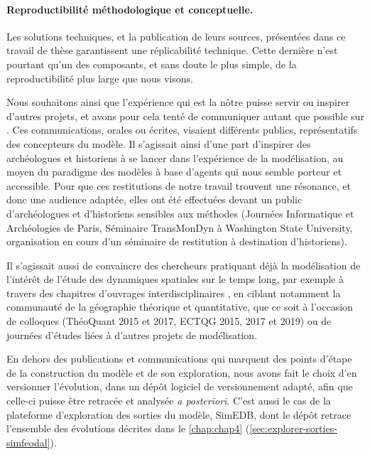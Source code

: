 \paragraph{Reproductibilité méthodologique et conceptuelle.}

Les solutions techniques, et la publication de leurs sources, présentées dans ce travail de thèse garantissent une réplicabilité technique.
Cette dernière n'est pourtant qu'un des composants, et sans doute le plus simple, de la reproductibilité plus large que nous visons.

Nous souhaitons ainsi que l'expérience qui est la nôtre puisse servir ou inspirer d'autres projets, et avons pour cela tenté de communiquer autant que possible sur \simfeodal{}.
Ces communications, orales ou écrites, visaient différents publics, représentatifs des concepteurs du modèle.
Il s'agissait ainsi d'une part d'inspirer des archéologues et historiens à se lancer dans l'expérience de la modélisation, au moyen du paradigme des modèles à base d'agents qui nous semble porteur et accessible.
Pour que ces restitutions de notre travail trouvent une résonance, et donc une audience adaptée, elles ont été effectuées devant un public d'archéologues et d'historiens sensibles aux méthodes (Journées Informatique et Archéologies de Paris, Séminaire TransMonDyn à Washington State University, organisation en cours d'un séminaire de restitution à destination d'historiens).

Il s'agissait aussi de convaincre des chercheurs pratiquant déjà la modélisation de l'intérêt de l'étude des dynamiques spatiales sur le temps long, par exemple à travers des chapitres d'ouvrages interdisciplinaires \autocite{tannier_ontologie_2014,cura_transition_2017}, en ciblant notamment la communauté de la géographie théorique et quantitative, que ce soit à l'occasion de colloques (ThéoQuant 2015 et 2017, ECTQG 2015, 2017 et 2019) ou de journées d'études liées à d'autres projets de modélisation.

En dehors des publications et communications qui marquent des \og points d'étape\fg{} de la construction du modèle et de son exploration, nous avons fait le choix d'en \og versionner\fg{} l'évolution, dans un dépôt logiciel de versionnement adapté, afin que celle-ci puisse être retracée et analysée \textit{a posteriori}.
C'est aussi le cas de la plateforme d'exploration des sorties du modèle, SimEDB, dont le dépôt retrace l'ensemble des évolutions décrites dans le \cref{chap:chap4} (\cref{sec:explorer-sorties-simfeodal}).

